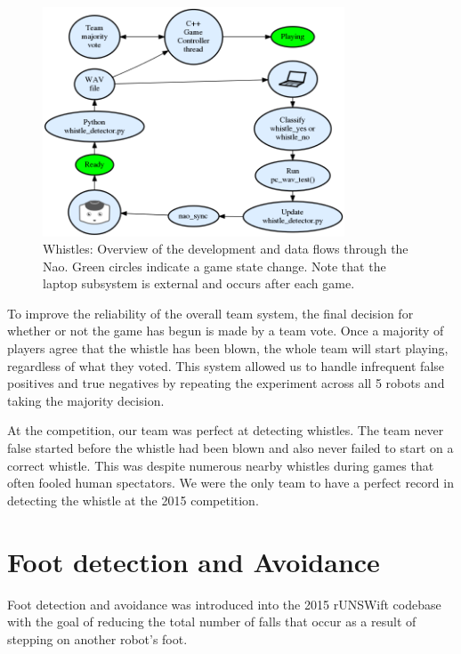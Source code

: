 \documentclass[runningheads,a4paper]{llncs}
\begin{document}
\begin{figure}
\centering
\includegraphics[width=0.8\textwidth]{Figures/figWhistleDataFlow}
\caption{Whistles: Overview of the development and data flows through the Nao. Green circles indicate a game state change. Note that the laptop subsystem is external and occurs after each game.}
\label{figWhistleDataFlow}
\end{figure}

To improve the reliability of the overall team system, the final decision for whether or not the game has begun is made by a team vote. Once a majority of players agree that the whistle has been blown, the whole team will start playing, regardless of what they voted. This system allowed us to handle infrequent false positives and true negatives by repeating the experiment across all 5 robots and taking the majority decision.

At the competition, our team was perfect at detecting whistles. The team never false started before the whistle had been blown and also never failed to start on a correct whistle. This was despite numerous nearby whistles during games that often fooled human spectators. We were the only team to have a perfect record in detecting the whistle at the 2015 competition.

\section{Foot detection and Avoidance}

Foot detection and avoidance was introduced into the 2015 rUNSWift codebase with the goal of reducing the total number of falls that occur as a result of stepping on another robot's foot. 
\end{document}

